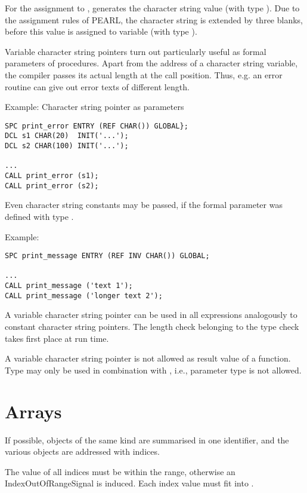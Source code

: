 For the  assignment to ,  generates
 the character string
value  (with type ).
 Due to the assignment
rules of PEARL, the character string is extended by three blanks, before
this value is assigned to variable  (with type ).

Variable character string pointers turn out particularly useful as
formal parameters of procedures. Apart from the address of a character
string variable, the compiler passes its actual length at the call
position.  Thus, e.g. an error routine can give out error texts of
different length.

Example: Character string pointer as parameters

\begin{lstlisting}
SPC print_error ENTRY (REF CHAR()) GLOBAL};
DCL s1 CHAR(20)  INIT('...');
DCL s2 CHAR(100) INIT('...');

...
CALL print_error (s1);
CALL print_error (s2);
\end{lstlisting}

Even character string constants may be passed, if the formal parameter
was defined with type .

Example:

\begin{lstlisting}
SPC print_message ENTRY (REF INV CHAR()) GLOBAL;

...
CALL print_message ('text 1');
CALL print_message ('longer text 2');
\end{lstlisting}

A variable character string pointer can be used in all expressions
analogously to constant character string pointers. The length check
belonging to the type check takes first place at run time.

A variable character string pointer is not allowed as result value of a
function. Type  may only be used in combination with ,
i.e., parameter type  is not allowed.

\section{Arrays}   %
\label{sec_array}

If possible, objects of the same kind are summarised in
one identifier, and the various objects are addressed with indices.

The value of all indices must be within the range, otherwise
an IndexOutOfRangeSignal is induced.
Each index value must fit into . 

